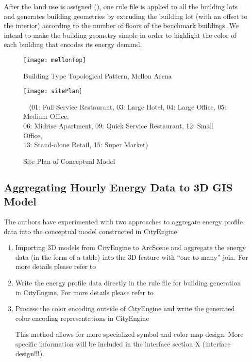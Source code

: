 After the land use is assigned (), one rule file is
applied to all the building lots and generates building geometries by
extruding the building lot (with an offset to the interior) according
to the number of floors of the benchmark buildings. We intend to make
the building geometry simple in order to highlight the color of each
building that encodes its energy demand.

\begin{figure}[h!]
  \centering
  \texttt{[image: mellonTop]}
  \caption[Building Type Topology]{Building Type Topological Pattern, Mellon Arena}
  \label{fig:mellonTop}
\end{figure}

\begin{figure}[h!]
  \centering
  \texttt{[image: sitePlan]}
  \caption[Conceptual Model Site Plan]{Site Plan of Conceptual Model}~ (01: Full Service
  Restaurant, 03: Large Hotel, 04: Large Office, 05: Medium Office,
  \\06: Midrise Apartment, 09: Quick Service Restaurant, 12: Small
  Office, \\13: Stand-alone Retail, 15: Super Market)
  \label{fig:sitePlan}
\end{figure}

\subsection{Aggregating Hourly Energy Data to 3D GIS Model}\label{sec:aggregateTime}
The authors have experimented with two approaches to aggregate energy
profile data into the conceptual model constructed in CityEngine
\begin{enumerate}[1)]
\item Importing 3D models from CityEngine to ArcScene and aggregate
  the energy data (in the form of a table) into the 3D feature with
  ``one-to-many'' join. For more details please refer to

\item Write the energy profile data directly in the rule file for
  building generation in CityEngine. For more details please refer to

\item Process the color encoding outside of CityEngine and write the
  generated color encoding representations in CityEngine

  This method allows for more specialized symbol and color map
  design. More specific information will be included in the interface
  section X (interface design!!!).

\end{enumerate}


